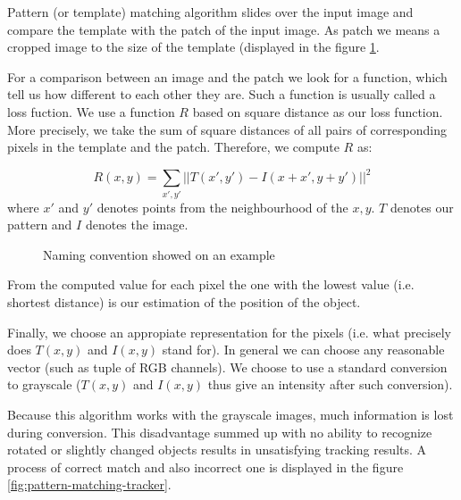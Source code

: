 Pattern (or template) matching algorithm slides over the input image and
compare the template with the patch of the input image. As patch we means a
cropped image to the size of the template (displayed in the figure
\ref{fig:patternmatching-naming}.

For a comparison between an image and the patch we look for a function, which
tell us how different to each other they are. Such a function is usually called
a loss fuction. We use a function $R$ based on square distance as our loss
function. More precisely, we take the sum of square distances of all pairs of
corresponding pixels in the template and the patch. Therefore, we compute $R$
as:

$$
R(x, y) =
\sum_{x', y'} ||T(x', y') - I(x + x', y + y')||^2
$$
where $x'$ and $y'$ denotes points from the neighbourhood of the $x, y$. $T$
denotes our pattern and $I$ denotes the image. 

\begin{figure}[h]
	\centering
	\def\svgwidth{0.9\linewidth}
	
	\caption{Naming convention showed on an example}
	\label{fig:patternmatching-naming}
\end{figure}

From the computed value for each pixel the one with the lowest value
(i.e. shortest distance) is our estimation of the position of the object.

Finally, we choose an appropiate representation for the pixels (i.e. what
precisely does $T(x, y)$ and $I(x, y)$ stand for). In general we can choose any
reasonable vector (such as tuple of RGB channels). We choose to use a standard
conversion to grayscale ($T(x, y)$ and $I(x, y)$ thus give an intensity after
such conversion).

Because this algorithm works with the grayscale images, much information is
lost during conversion. This disadvantage summed up with no ability to
recognize rotated or slightly changed objects results in unsatisfying tracking
results. A process of correct match and also incorrect one is displayed in the
figure \ref{fig:pattern-matching-tracker}.

